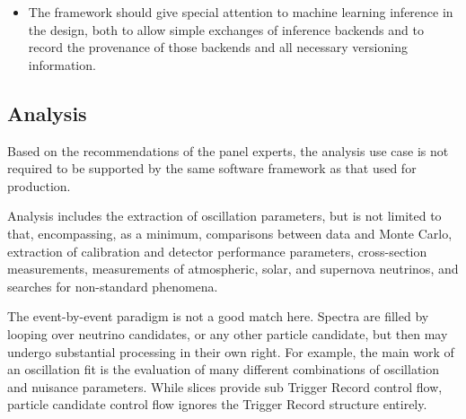 \documentclass[../main-v1.tex]{subfiles}
\begin{document}
\begin{itemize}
\item The framework should give special attention to machine learning inference in the design, both to allow simple exchanges of inference backends and to record the provenance of those backends and all necessary versioning information.



\end{itemize}


\subsection{Analysis}

Based on the recommendations of the  panel experts, the analysis use case is not required to be supported by the same software framework as that used for production.


Analysis includes the extraction of oscillation parameters, but is not limited to that, encompassing, as a minimum, comparisons between data and Monte Carlo, extraction of calibration and detector performance parameters, cross-section measurements, measurements of atmospheric, solar, and supernova neutrinos, and searches for non-standard phenomena.

The event-by-event paradigm is not a good match here. Spectra are filled by looping over neutrino candidates, or any other particle candidate, but then may undergo substantial processing in their own right. For example, the main work of an oscillation fit is the evaluation of many different combinations of oscillation and nuisance parameters.  While slices provide sub Trigger Record control flow, particle candidate control flow ignores the Trigger Record structure entirely.




\end{document}
